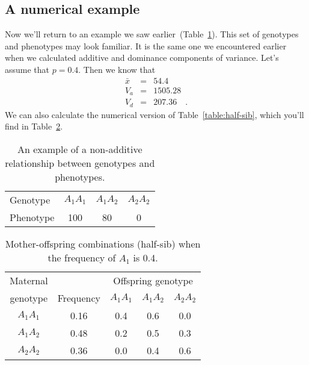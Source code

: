 \documentclass[12pt]{article}
\begin{document}
\subsection*{A numerical example}

Now we'll return to an example we saw
earlier~(Table~\ref{table:example}). This set of genotypes and
phenotypes may look familiar. It is the same one we encountered
earlier when we calculated additive and dominance components of
variance. Let's assume that $p = 0.4$. Then we know that
\begin{eqnarray*}
\bar x &=& 54.4 \\
V_a &=& 1505.28 \\
V_d &=& 207.36 \quad .
\end{eqnarray*}
We can also calculate the numerical version of
Table~\ref{table:half-sib}, which you'll find in
Table~\ref{table:example-hs}.

\begin{table}
\begin{center}
\begin{tabular}{l|ccc}
\hline\hline
Genotype  & $A_1A_1$ & $A_1A_2$ & $A_2A_2$ \\
Phenotype & 100        & 80      & 0 \\
\hline
\end{tabular}
\end{center}
\caption{An example of a non-additive relationship between genotypes
  and phenotypes.}\label{table:example}
\end{table}

\begin{table}
\begin{center}
\begin{tabular}{c|c|ccc}
\hline\hline
Maternal &           & \multicolumn{3}{c}{Offspring genotype} \\
genotype & Frequency & $A_1A_1$ & $A_1A_2$ & $A_2A_2$ \\
\hline
$A_1A_1$ & 0.16      & 0.4      & 0.6      & 0.0 \\
$A_1A_2$ & 0.48      & 0.2      & 0.5      & 0.3 \\
$A_2A_2$ & 0.36      & 0.0      & 0.4      & 0.6 \\
\hline
\end{tabular}
\end{center}
\caption{Mother-offspring combinations (half-sib) when the frequency
  of $A_1$ is 0.4.}\label{table:example-hs}
\end{table}
\end{document}
